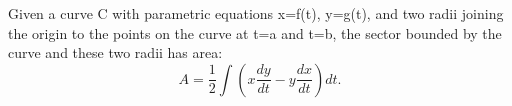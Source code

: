  Given a curve C with parametric equations x=f(t), y=g(t), and two 
radii joining the origin to the points on the curve at t=a and t=b, the 
sector bounded by the curve and these two radii has area:
\[ A = \frac{1}{2} \int ( x \frac{dy}{dt} - y \frac{dx}{dt} ) dt . \]
